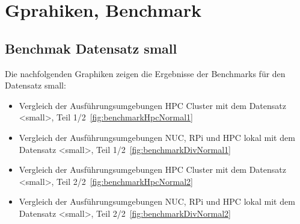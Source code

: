 \label{apx:a}
\section{Gprahiken, Benchmark}
\label{sec:benchmark}

\subsection{Benchmak Datensatz small}

Die nachfolgenden Graphiken zeigen die Ergebnisse der Benchmarks für den Datensatz small:

\begin{itemize}
	\item Vergleich der Ausführungsumgebungen HPC Cluster mit dem Datensatz <small>, Teil 1/2~\autoref{fig:benchmarkHpcNormal1}
	\item Vergleich der Ausführungsumgebungen NUC, RPi und HPC lokal mit dem Datensatz <small>, Teil 1/2~\autoref{fig:benchmarkDivNormal1}
	\item Vergleich der Ausführungsumgebungen HPC Cluster mit dem Datensatz <small>, Teil 2/2~\autoref{fig:benchmarkHpcNormal2}
	\item Vergleich der Ausführungsumgebungen NUC, RPi und HPC lokal mit dem Datensatz <small>, Teil 2/2~\autoref{fig:benchmarkDivNormal2}
\end{itemize}

